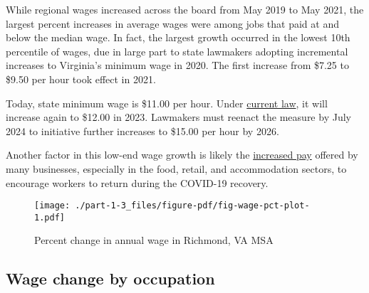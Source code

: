 \documentclass[
  letterpaper,
  DIV=11,
  numbers=noendperiod]{scrreprt}
\begin{document}
While regional wages increased across the board from May 2019 to May
2021, the largest percent increases in average wages were among jobs
that paid at and below the median wage. In fact, the largest growth
occurred in the lowest 10th percentile of wages, due in large part to
state lawmakers adopting incremental increases to Virginia's minimum
wage in 2020. The first increase from \$7.25 to \$9.50 per hour took
effect in 2021.

\begin{tcolorbox}[enhanced jigsaw, colframe=quarto-callout-note-color-frame, arc=.35mm, bottomrule=.15mm, colbacktitle=quarto-callout-note-color!10!white, opacityback=0, left=2mm, rightrule=.15mm, title=\textcolor{quarto-callout-note-color}{\faInfo}\hspace{0.5em}{Note}, colback=white, coltitle=black, toptitle=1mm, leftrule=.75mm, titlerule=0mm, breakable, opacitybacktitle=0.6, toprule=.15mm, bottomtitle=1mm]

Today, state minimum wage is \$11.00 per hour. Under
\href{https://lis.virginia.gov/cgi-bin/legp604.exe?201+sum+SB7}{current
law}, it will increase again to \$12.00 in 2023. Lawmakers must reenact
the measure by July 2024 to initiative further increases to \$15.00 per
hour by 2026.

\end{tcolorbox}

Another factor in this low-end wage growth is likely the
\href{https://www.bls.gov/opub/ted/2022/24-percent-of-establishments-increased-pay-or-paid-bonuses-because-of-covid-19-pandemic.htm}{increased
pay} offered by many businesses, especially in the food, retail, and
accommodation sectors, to encourage workers to return during the
COVID-19 recovery.

\begin{figure}

{\centering \texttt{[image: ./part-1-3\_files/figure-pdf/fig-wage-pct-plot-1.pdf]}

}

\caption{\label{fig-wage-pct-plot}Percent change in annual wage in
Richmond, VA MSA}

\end{figure}

\hypertarget{wage-change-by-occupation}{%
\subsection{Wage change by occupation}\label{wage-change-by-occupation}}
\end{document}
